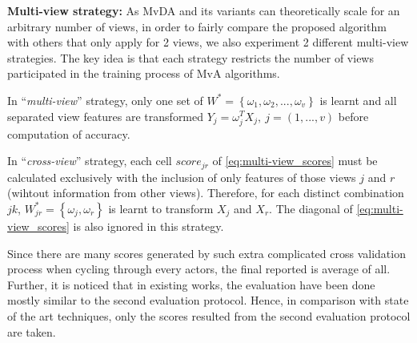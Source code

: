     \textbf{Multi-view strategy:} As MvDA and its variants can theoretically scale for an arbitrary number of views, in order to fairly compare the proposed algorithm with others that only apply for 2 views, we also experiment 2 different multi-view strategies. The key idea is that each strategy restricts the number of views participated in the training process of MvA algorithms.

    In ``\emph{multi-view}'' strategy, only one set of $W^*=\left\{{\omega}_1, {\omega}_2, ..., {\omega}_v\right\}$ is learnt and all separated view features are transformed $Y_j=\omega_j^TX_j,\ j=(1,...,v)$ before computation of accuracy.

    In ``\emph{cross-view}'' strategy, each cell ${score}_{jr}$ of \eqref{eq:multi-view_scores} must be calculated exclusively with the inclusion of only features of those views $j$ and $r$ (wihtout information from other views).
    Therefore, for each distinct combination $jk$, $W_{jr}^*=\left\{{\omega}_j, {\omega}_r\right\}$ is learnt to transform $X_j$ and $X_r$. The diagonal of \eqref{eq:multi-view_scores} is also ignored in this strategy.

    Since there are many scores generated by such extra complicated cross validation process when cycling through every actors, the final reported is average of all.
    Further, it is noticed that in existing works, the evaluation have been done mostly similar to the second evaluation protocol. Hence, in comparison with state of the art techniques, only the scores resulted from the second evaluation protocol are taken.
